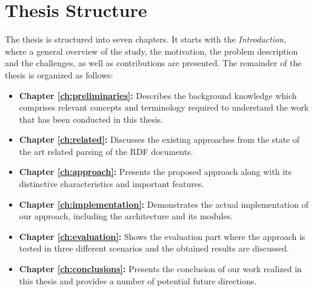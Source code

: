 \section {Thesis Structure}
The thesis is structured into seven chapters. 
It starts with the \emph{Introduction}, where a general overview of the study, the motivation, the problem description and the challenges, as well as contributions are presented. 
The remainder of the thesis is organized as follows:
\begin{itemize}
	\item { \textbf{Chapter \ref{ch:preliminaries}:} Describes the background knowledge which comprises relevant concepts and terminology required to understand the work that has been conducted in this thesis.}
	
	\item {\textbf{Chapter \ref{ch:related}:}} Discusses the existing approaches from the state of the art related parsing of the RDF documents. 
		
	\item {\textbf{Chapter \ref{ch:approach}:}} Presents the proposed approach along with its distinctive characteristics and important features. 
	
	\item {\textbf{Chapter \ref{ch:implementation}:}} Demonstrates the actual implementation of our approach, including the architecture and its modules.
	
	\item {\textbf{Chapter \ref{ch:evaluation}:}} Shows the evaluation part where the approach is tested in three different scenarios and the obtained results are discussed.

	\item {\textbf{Chapter \ref{ch:conclusions}:}} 
	Presents the conclusion of our work realized in this thesis and provides a number of potential future directions.
\end{itemize}







